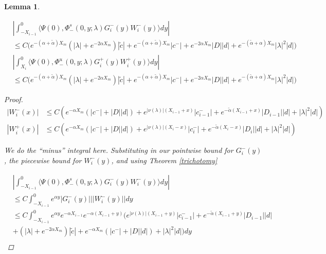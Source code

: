 \documentclass[12pt]{article}
\newtheorem{lemma}{Lemma}
\begin{document}
\begin{lemma}\label{noncenterW}

\begin{align*}
&\left| \int_{-X_{i-1}}^0 \langle \Psi(0), \Phi^s_-(0, y; \lambda) G_i^-(y) W_i^-(y) \rangle dy \right| \\
&\leq C\Big( e^{-(\alpha + \tilde{\alpha}) X_m} (|\lambda| + e^{-2 \alpha X_m}) |\tilde{c}| + e^{-(\alpha + \tilde{\alpha}) X_m} |c^-| + e^{-2 \alpha X_m} |D||d| + e^{-(\tilde{\alpha} + \alpha) X_m} |\lambda|^2 |d| \Big) \\
&\left| \int_{X_i}^0 \langle \Psi(0), \Phi^u_-(0, y; \lambda) G_i^+(y) W_i^+(y) \rangle dy \right| \\
&\leq C\Big( e^{-(\alpha + \tilde{\alpha}) X_m} (|\lambda| + e^{-2 \alpha X_m}) |\tilde{c}| + e^{-(\alpha + \tilde{\alpha}) X_m} |c^-| + e^{-2 \alpha X_m} |D||d| + e^{-(\tilde{\alpha} + \alpha) X_m} |\lambda|^2 |d| \Big) 
\end{align*}

\begin{proof}

\begin{align*}
|W_i^-(x)| &\leq C ( e^{-\alpha X_m}( |c^-| + |D||d|) + e^{|\nu(\lambda)|(X_{i-1} + x)} |c_{i-1}^-| + e^{-\tilde{\alpha}(X_{i-1} + x)}|D_{i-1}||d| + |\lambda|^2 |d| ) \\
|W_i^+(x)| &\leq C ( e^{-\alpha X_m}( |c^-| + |D||d|) + e^{|\nu(\lambda)|(X_i - x)} |c_i^-| + e^{-\tilde{\alpha}(X_i - x)}|D_i||d| + |\lambda|^2 |d| )
\end{align*}

We do the ``minus'' integral here. Substituting in our pointwise bound for $G_i^-(y)$, the piecewise bound for $W_i^-(y)$, and using Theorem \ref{trichotomy}

\begin{align*}
&\left| \int_{-X_{i-1}}^0 \langle \Psi(0), \Phi^s_-(0, y; \lambda) G_i^-(y) W_i^-(y) \rangle dy \right| \\
&\leq C \int_{-X_{i-1}}^0 e^{\alpha y} |G_i^-(y)| ||W_i^-(y)|| dy \\
&\leq C \int_{-X_{i-1}}^0 e^{\alpha y} e^{-\alpha X_{i-1}} e^{-\alpha(X_{i-1} + y)} \Big( e^{|\nu(\lambda)|(X_{i-1} + y)} |c_{i-1}^-| + e^{-\tilde{\alpha}(X_{i-1} + y)}|D_{i-1}||d| \\
&+ (|\lambda| + e^{-2 \alpha X_m}) |\tilde{c}| + e^{-\alpha X_m}( |c^-| + |D||d|) + |\lambda|^2 |d| \Big) dy \\
\end{align*}


\end{proof}
\end{lemma}
\end{document}
